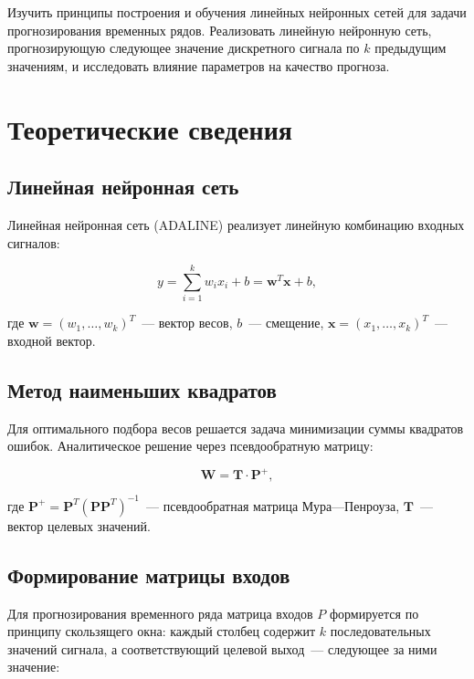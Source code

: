 \documentclass[14pt,a4paper]{extarticle}
\begin{document}
Изучить принципы построения и обучения линейных нейронных сетей для задачи прогнозирования временных рядов. Реализовать линейную нейронную сеть, прогнозирующую следующее значение дискретного сигнала по $k$ предыдущим значениям, и исследовать влияние параметров на качество прогноза.

\section{Теоретические сведения}

\subsection{Линейная нейронная сеть}

Линейная нейронная сеть (ADALINE) реализует линейную комбинацию входных сигналов:

\begin{equation}
y = \sum_{i=1}^{k} w_i x_i + b = \mathbf{w}^T \mathbf{x} + b,
\end{equation}

где $\mathbf{w} = (w_1, \ldots, w_k)^T$~--- вектор весов, $b$~--- смещение, $\mathbf{x} = (x_1, \ldots, x_k)^T$~--- входной вектор.

\subsection{Метод наименьших квадратов}

Для оптимального подбора весов решается задача минимизации суммы квадратов ошибок. Аналитическое решение через псевдообратную матрицу:

\begin{equation}
\mathbf{W} = \mathbf{T} \cdot \mathbf{P}^+,
\end{equation}

где $\mathbf{P}^+ = \mathbf{P}^T (\mathbf{P} \mathbf{P}^T)^{-1}$~--- псевдообратная матрица Мура---Пенроуза, $\mathbf{T}$~--- вектор целевых значений.

\subsection{Формирование матрицы входов}

Для прогнозирования временного ряда матрица входов $P$ формируется по принципу скользящего окна: каждый столбец содержит $k$ последовательных значений сигнала, а соответствующий целевой выход~--- следующее за ними значение:
\end{document}
